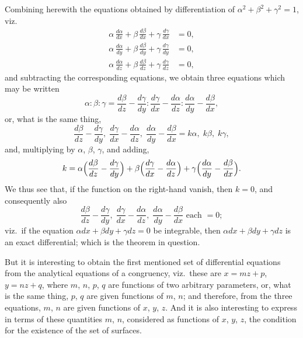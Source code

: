 \documentclass[12pt,a4paper]{article}
\begin{document}
Combining herewith the equations obtained by differentiation of $\alpha^2 + \beta^2 + \gamma^2 = 1$, viz.
\begin{align*}
\alpha\,\frac{d\alpha}{dx} + \beta\,\frac{d\beta}{dx} + \gamma\,\frac{d\gamma}{dx} &= 0, \\
\alpha\,\frac{d\alpha}{dy} + \beta\,\frac{d\beta}{dy} + \gamma\,\frac{d\gamma}{dy} &= 0, \\
\alpha\,\frac{d\alpha}{dz} + \beta\,\frac{d\beta}{dz} + \gamma\,\frac{d\gamma}{dz} &= 0,
\end{align*}
and subtracting the corresponding equations, we obtain three equations which may be written
\[
\alpha : \beta : \gamma = \frac{d\beta}{dz} - \frac{d\gamma}{dy} : \frac{d\gamma}{dx} - \frac{d\alpha}{dz} : \frac{d\alpha}{dy} - \frac{d\beta}{dx},
\]
or, what is the same thing,
\[
\frac{d\beta}{dz} - \frac{d\gamma}{dy},\; \frac{d\gamma}{dx} - \frac{d\alpha}{dz},\; \frac{d\alpha}{dy} - \frac{d\beta}{dx} = k\alpha,\; k\beta,\; k\gamma,
\]
and, multiplying by $\alpha$, $\beta$, $\gamma$, and adding,
\[
k = \alpha\Bigl(\frac{d\beta}{dz} - \frac{d\gamma}{dy}\Bigr) + \beta\Bigl(\frac{d\gamma}{dx} - \frac{d\alpha}{dz}\Bigr) + \gamma\Bigl(\frac{d\alpha}{dy} - \frac{d\beta}{dx}\Bigr).
\]
We thus see that, if the function on the right-hand vanish, then $k=0$, and consequently also
\[
\frac{d\beta}{dz} - \frac{d\gamma}{dy},\; \frac{d\gamma}{dx} - \frac{d\alpha}{dz},\; \frac{d\alpha}{dy} - \frac{d\beta}{dx} \text{ each } = 0;
\]
viz.\ if the equation $\alpha dx + \beta dy + \gamma dz = 0$ be integrable, then $\alpha dx + \beta dy + \gamma dz$ is an exact differential; which is the theorem in question.

But it is interesting to obtain the first mentioned set of differential equations from the analytical equations of a congruency, viz.\ these are $x = mz + p$, $y = nz + q$, where $m$, $n$, $p$, $q$ are functions of two arbitrary parameters, or, what is the same thing, $p$, $q$ are given functions of $m$, $n$; and therefore, from the three equations, $m$, $n$ are given functions of $x$, $y$, $z$. And it is also interesting to express in terms of these quantities $m$, $n$, considered as functions of $x$, $y$, $z$, the condition for the existence of the set of surfaces.
\end{document}
